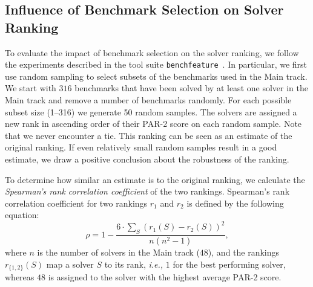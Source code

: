 \documentclass{elsarticle}
\begin{document}
\subsection{Influence of Benchmark Selection on Solver Ranking}
To evaluate the impact
of benchmark selection on the solver ranking, we follow the experiments
described in the tool suite
\texttt{benchfeature}~\cite{benchfeature}.
In particular, we first use random sampling to select subsets of the benchmarks used in the Main track.
We start with $316$ benchmarks that have been solved by at least one solver in
the Main track and remove a number of benchmarks randomly. For each
possible subset size (1--316) we generate 50 random samples.
The solvers are assigned a new rank in ascending order of their PAR-2 score on
each random sample. Note that we never encounter a tie. This ranking can be
seen as an estimate of the original ranking.
If even relatively small random samples result in a good estimate, we draw a
positive conclusion about the robustness of the ranking.

To determine how similar an estimate is to the original ranking, we calculate
the \emph{Spearman's rank correlation coefficient} of the two rankings.
Spearman's rank correlation coefficient
for two rankings $r_{1}$ and $r_{2}$
is defined by the following equation:
\[
    \rho = 1 - \frac{6\cdot\sum_{S}{(r_{1}(S) - r_{2}(S))^2}}{n(n^2-1)},
\]
where $n$ is the number of solvers in the Main track ($48$), and the rankings
$r_{\{1,2\}}(S)$ map a solver $S$ to its rank, \emph{i.e.,} $1$ for the best
performing solver, whereas $48$ is assigned to the solver
with the highest average PAR-2 score.
\end{document}
